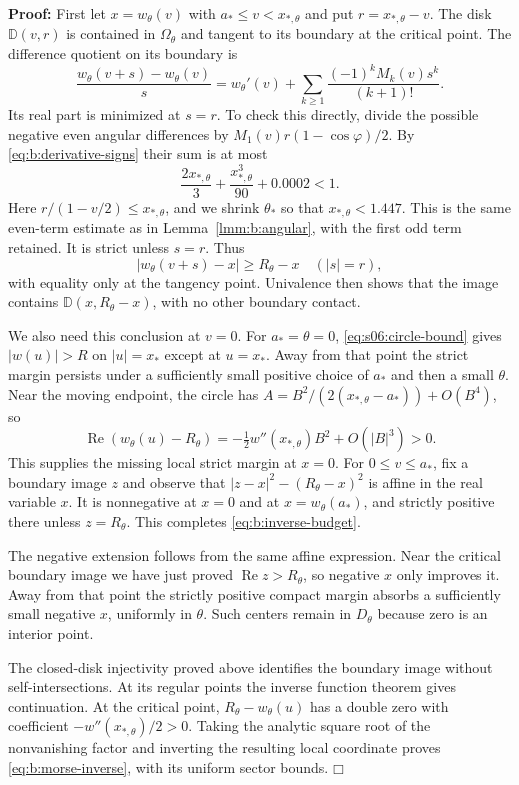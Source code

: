 \documentclass[a4paper,10pt]{article}
\numberwithin{equation}{section}
\theoremstyle{paperplain}
\theoremstyle{paperremark}
\theoremstyle{paperplain}
\newenvironment{prf}{\noindent \textbf{Proof: }}{\hfill $\mdlgwhtsquare$\par\addvspace{0.5\baselineskip}}
\begin{document}
\begin{prf}
First let $x=w_\theta(v)$ with $a_*\leq v<x_{*,\theta}$ and put
$r=x_{*,\theta}-v$. The disk $\mathbb D(v,r)$ is contained in
$\Omega_\theta$ and tangent to its boundary at the critical point.
The difference quotient on its boundary is
\[
 \frac{w_\theta(v+s)-w_\theta(v)}s
 =w_\theta'(v)+\sum_{k\geq1}
                       \frac{(-1)^kM_k(v)s^k}{(k+1)!}.
\]
Its real part is minimized at $s=r$. To check this directly, divide
the possible negative even angular differences by
$M_1(v)r(1-\cos\varphi)/2$.
By \eqref{eq:b:derivative-signs} their sum is at most
\[
 \frac{2x_{*,\theta}}3+\frac{x_{*,\theta}^3}{90}+0.0002<1.
\]
Here $r/(1-v/2)\leq x_{*,\theta}$, and we shrink $\theta_*$ so
that $x_{*,\theta}<1.447$. This is the same even-term estimate as
in Lemma~\ref{lmm:b:angular}, with the first odd term retained.
It is strict unless $s=r$. Thus
\[
 |w_\theta(v+s)-x|\geq R_\theta-x\quad(|s|=r),
\]
with equality only at the tangency point. Univalence then shows that
the image contains $\mathbb D(x,R_\theta-x)$, with no other
boundary contact.

We also need this conclusion at $v=0$. For $a_*=\theta=0$,
\eqref{eq:s06:circle-bound} gives
$|w(u)|>R$ on $|u|=x_*$ except at $u=x_*$. Away from that point
the strict margin persists under a sufficiently small positive
choice of $a_*$ and then a small $\theta$. Near the moving endpoint,
the circle has $A=B^2/(2(x_{*,\theta}-a_*))+O(B^4)$, so
\[
 \operatorname{Re}(w_\theta(u)-R_\theta)
             =-\tfrac12w''(x_{*,\theta})B^2+O(|B|^3)>0.
\]
This supplies the missing local strict margin at $x=0$.
For $0\leq v\leq a_*$, fix a boundary image $z$ and observe that
$|z-x|^2-(R_\theta-x)^2$ is affine in the real variable $x$.
It is nonnegative at $x=0$ and at $x=w_\theta(a_*)$, and strictly
positive there unless $z=R_\theta$. This completes
\eqref{eq:b:inverse-budget}.

The negative extension follows from the same affine expression.
Near the critical boundary image we have just proved
$\operatorname{Re}z>R_\theta$, so negative $x$ only improves it.
Away from that point the strictly positive compact margin absorbs a
sufficiently small negative $x$, uniformly in $\theta$. Such centers
remain in $D_\theta$ because zero is an interior point.

The closed-disk injectivity proved above identifies the boundary
image without self-intersections. At its regular points the inverse
function theorem gives continuation. At the critical point,
$R_\theta-w_\theta(u)$ has a double zero with coefficient
$-w''(x_{*,\theta})/2>0$. Taking the analytic square root of the
nonvanishing factor and inverting the resulting local coordinate
proves \eqref{eq:b:morse-inverse}, with its uniform sector bounds.
\end{prf}
\end{document}
